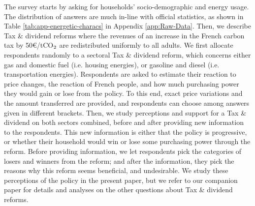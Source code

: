 \documentclass[english,5p,authoryear]{elsarticle}
\begin{document}
The survey starts by asking for households' socio-demographic and energy usage. The distribution of answers are much in-line with official statistics, as shown in Table \ref{tab:app-energetic-characs} in Appendix \ref{app:Raw-Data}. Then, we describe Tax \& dividend reforms where the revenues of an increase in the French carbon tax by 50\euro{}/tCO$_\textnormal{2}$ are redistributed uniformly to all adults. We first allocate respondents randomly to a sectoral Tax \& dividend reform, which concerns either gas and domestic fuel (i.e. housing energies), or gasoline and diesel (i.e. transportation energies). Respondents are asked to estimate their reaction to price changes, the reaction of French people, and how much purchasing power they would gain or lose from the policy. To this end, exact price variations and the amount transferred are provided, and respondents can choose among answers given in different brackets. Then, we study perceptions and support for a Tax \& dividend on both sectors combined, before and after providing new information to the respondents. This new information is either that the policy is progressive, or whether their household would win or lose some purchasing power through the reform. Before providing information, we let respondents pick the categories of losers and winners from the reform; and after the information, they pick the reasons why this reform seems beneficial, and undesirable. We study these perceptions of the policy in the present paper, but we refer to our companion paper \citep{douenne_can_2019} for details and analyses on the other questions about Tax \& dividend reforms. %

\end{document}
